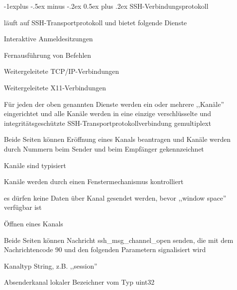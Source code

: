 \documentclass[a4paper]{article}
\makeatletter
\renewcommand{\subsection}{\@startsection{subsection}{2}{0mm}%
 {-1explus -.5ex minus -.2ex}%
 {0.5ex plus .2ex}%
 {\normalfont\normalsize\bfseries}}
\makeatother
\begin{document}
\begin{multicols}{3}
      \subsection{SSH-Verbindungsprotokoll}
      \begin{itemize*}
            \item läuft auf SSH-Transportprotokoll und bietet folgende Dienste
            \begin{itemize*}
                  \item Interaktive Anmeldesitzungen
                  \item Fernausführung von Befehlen
                  \item Weitergeleitete TCP/IP-Verbindungen
                  \item Weitergeleitete X11-Verbindungen
            \end{itemize*}
            \item Für jeden der oben genannten Dienste werden ein oder mehrere ,,Kanäle'' eingerichtet und alle Kanäle werden in eine einzige verschlüsselte und integritätsgeschützte SSH-Transportprotokollverbindung gemultiplext
            \begin{itemize*}
                  \item Beide Seiten können Eröffnung eines Kanals beantragen und Kanäle werden durch Nummern beim Sender und beim Empfänger gekennzeichnet
                  \item Kanäle sind typisiert%
                  \item Kanäle werden durch einen Fenstermechanismus kontrolliert
                  \item es dürfen keine Daten über Kanal gesendet werden, bevor ,,window space'' verfügbar ist
            \end{itemize*}
            \item Öffnen eines Kanals
            \begin{itemize*}
                  \item Beide Seiten können Nachricht ssh\_msg\_channel\_open senden, die mit dem Nachrichtencode 90 und den folgenden Parametern signalisiert wird
                  \begin{description*}
                        \item[Kanaltyp] String, z.B. ,,session''%
                        \item[Absenderkanal] lokaler Bezeichner vom Typ uint32%

\end{description*}
\end{itemize*}
\end{itemize*}
\end{multicols}
\end{document}
